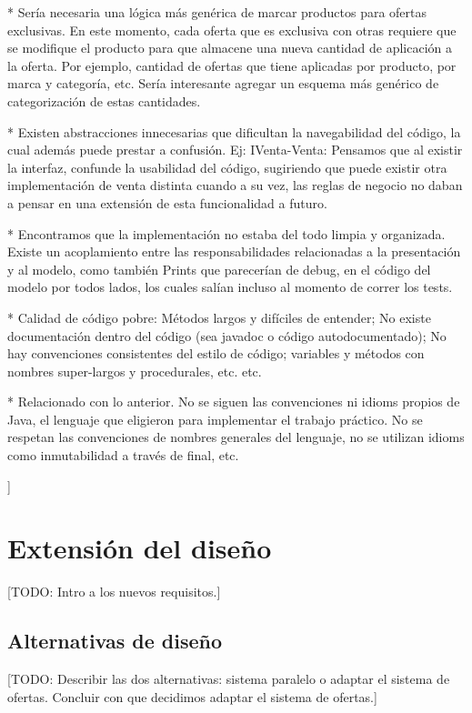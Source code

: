 \documentclass[a4paper,11pt]{article}
\begin{document}
  * Sería necesaria una lógica más genérica de marcar productos para ofertas
  exclusivas. En este momento, cada oferta que es exclusiva con otras
  requiere que se modifique el producto para que almacene una nueva cantidad de
  aplicación a la oferta. Por ejemplo, cantidad de ofertas que tiene aplicadas por producto,
  por marca y categoría, etc. Sería interesante agregar un esquema más genérico de 
  categorización de estas cantidades.

  * Existen abstracciones innecesarias que dificultan la navegabilidad del código, la cual 
  además puede prestar a confusión. Ej: IVenta-Venta: Pensamos que al existir la interfaz, 
  confunde la usabilidad del código, sugiriendo que puede existir otra implementación de venta
  distinta cuando a su vez, las reglas de negocio no daban a pensar en una extensión de esta 
  funcionalidad a futuro.
  
  * Encontramos que la implementación no estaba del todo limpia y organizada. Existe un
  acoplamiento entre las responsabilidades relacionadas a la presentación y al modelo,
  como también Prints que parecerían de debug, en el código del modelo por todos
  lados, los cuales salían incluso al momento de correr los tests.

  * Calidad de código pobre: Métodos largos y difíciles de entender; No existe documentación 
  dentro del código (sea javadoc o código autodocumentado); No hay convenciones consistentes
  del estilo de código; variables y métodos con nombres super-largos y procedurales, etc.  etc.

  * Relacionado con lo anterior. No se siguen las convenciones ni idioms
  propios de Java, el lenguaje que eligieron para implementar el trabajo
  práctico. No se respetan las convenciones de nombres generales del lenguaje,
  no se utilizan idioms como inmutabilidad a través de final, etc.

]

\section{Extensión del diseño}

[TODO: Intro a los nuevos requisitos.]

\subsection{Alternativas de diseño}

[TODO: Describir las dos alternativas: sistema paralelo o adaptar el sistema de
ofertas. Concluir con que decidimos adaptar el sistema de ofertas.]
\end{document}
